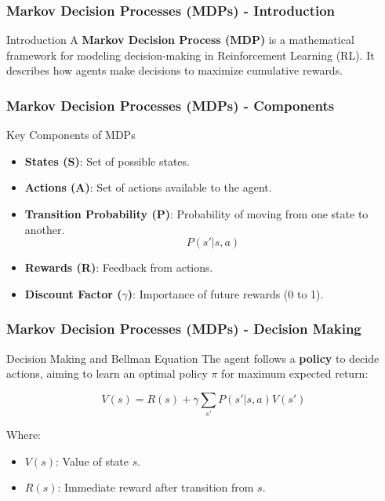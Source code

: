 \documentclass[aspectratio=169]{beamer}
\begin{document}
\begin{frame}[fragile]
    \frametitle{Markov Decision Processes (MDPs) - Introduction}
    \begin{block}{Introduction}
        A \textbf{Markov Decision Process (MDP)} is a mathematical framework for modeling decision-making in Reinforcement Learning (RL). It describes how agents make decisions to maximize cumulative rewards.
    \end{block}
\end{frame}

\begin{frame}[fragile]
    \frametitle{Markov Decision Processes (MDPs) - Components}
    \begin{block}{Key Components of MDPs}
        \begin{itemize}
            \item \textbf{States (S)}: Set of possible states.
            \item \textbf{Actions (A)}: Set of actions available to the agent.
            \item \textbf{Transition Probability (P)}: Probability of moving from one state to another. 
                \begin{equation}
                P(s' | s, a)
                \end{equation}
            \item \textbf{Rewards (R)}: Feedback from actions.
            \item \textbf{Discount Factor ($\gamma$)}: Importance of future rewards (0 to 1).
        \end{itemize}
    \end{block}
\end{frame}

\begin{frame}[fragile]
    \frametitle{Markov Decision Processes (MDPs) - Decision Making}
    \begin{block}{Decision Making and Bellman Equation}
        The agent follows a \textbf{policy} to decide actions, aiming to learn an optimal policy \( \pi \) for maximum expected return:
        
        \begin{equation}
        V(s) = R(s) + \gamma \sum_{s'} P(s' | s, a)V(s')
        \end{equation}
        
        Where:
        \begin{itemize}
            \item $V(s)$: Value of state $s$.
            \item $R(s)$: Immediate reward after transition from $s$.
        \end{itemize}
    \end{block}
\end{frame}
\end{document}
